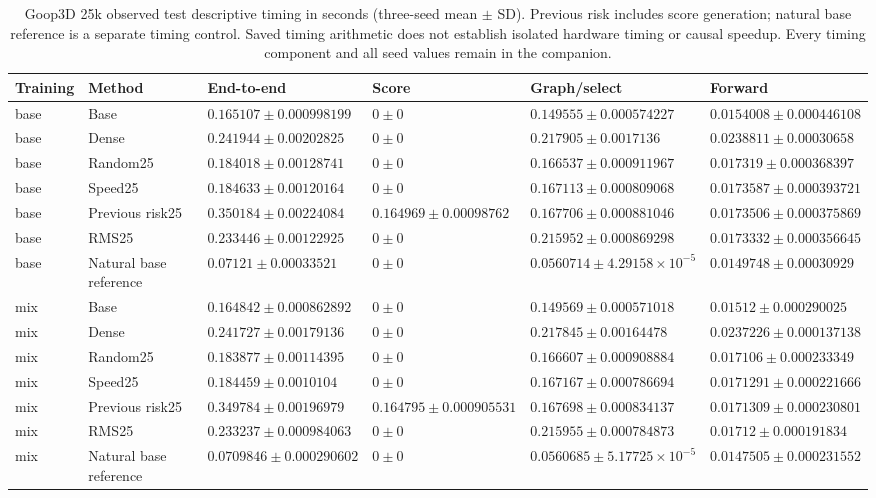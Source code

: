 \begin{table}[p]
\centering\scriptsize
\caption{Goop3D 25k observed test descriptive timing in seconds (three-seed mean $\pm$ SD). Previous risk includes score generation; natural base reference is a separate timing control. Saved timing arithmetic does not establish isolated hardware timing or causal speedup. Every timing component and all seed values remain in the companion.}
\label{tab:goop3d25k-observed-timing-test}
\setlength{\tabcolsep}{3pt}
\begin{tabular}{llllll}
\toprule
Training & Method & End-to-end & Score & Graph/select & Forward\\
\midrule
base & Base & $0.165107\pm0.000998199$ & $0\pm0$ & $0.149555\pm0.000574227$ & $0.0154008\pm0.000446108$\\
base & Dense & $0.241944\pm0.00202825$ & $0\pm0$ & $0.217905\pm0.0017136$ & $0.0238811\pm0.00030658$\\
base & Random25 & $0.184018\pm0.00128741$ & $0\pm0$ & $0.166537\pm0.000911967$ & $0.017319\pm0.000368397$\\
base & Speed25 & $0.184633\pm0.00120164$ & $0\pm0$ & $0.167113\pm0.000809068$ & $0.0173587\pm0.000393721$\\
base & Previous risk25 & $0.350184\pm0.00224084$ & $0.164969\pm0.00098762$ & $0.167706\pm0.000881046$ & $0.0173506\pm0.000375869$\\
base & RMS25 & $0.233446\pm0.00122925$ & $0\pm0$ & $0.215952\pm0.000869298$ & $0.0173332\pm0.000356645$\\
base & Natural base reference & $0.07121\pm0.00033521$ & $0\pm0$ & $0.0560714\pm4.29158\!\times\!10^{-5}$ & $0.0149748\pm0.00030929$\\
mix & Base & $0.164842\pm0.000862892$ & $0\pm0$ & $0.149569\pm0.000571018$ & $0.01512\pm0.000290025$\\
mix & Dense & $0.241727\pm0.00179136$ & $0\pm0$ & $0.217845\pm0.00164478$ & $0.0237226\pm0.000137138$\\
mix & Random25 & $0.183877\pm0.00114395$ & $0\pm0$ & $0.166607\pm0.000908884$ & $0.017106\pm0.000233349$\\
mix & Speed25 & $0.184459\pm0.0010104$ & $0\pm0$ & $0.167167\pm0.000786694$ & $0.0171291\pm0.000221666$\\
mix & Previous risk25 & $0.349784\pm0.00196979$ & $0.164795\pm0.000905531$ & $0.167698\pm0.000834137$ & $0.0171309\pm0.000230801$\\
mix & RMS25 & $0.233237\pm0.000984063$ & $0\pm0$ & $0.215955\pm0.000784873$ & $0.01712\pm0.000191834$\\
mix & Natural base reference & $0.0709846\pm0.000290602$ & $0\pm0$ & $0.0560685\pm5.17725\!\times\!10^{-5}$ & $0.0147505\pm0.000231552$\\
\bottomrule
\end{tabular}
\end{table}

